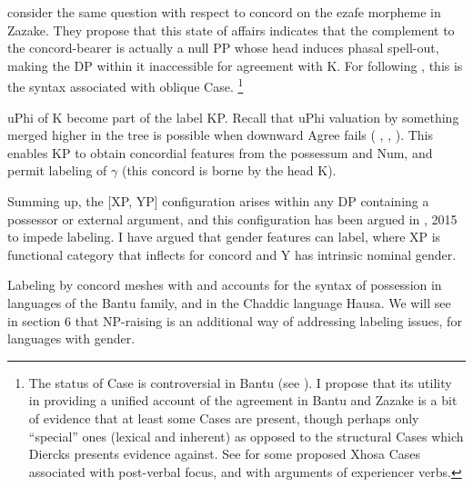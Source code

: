 \documentclass[output=paper
,modfonts
,nonflat]{langsci/langscibook}
\begin{document}
{\citet{Toosarvandani_Van_Urk2014} consider the same question with respect to concord on the ezafe morpheme in Zazake. They propose that this state of affairs indicates that the complement to the concord-bearer is actually a null PP whose head induces phasal spell-out, making the DP within it inaccessible for agreement with K. For \citet{Toosarvandani_Van_Urk2014} following \citet{Rezac2008}, this is the syntax associated with oblique Case. \footnote{The status of Case is controversial in Bantu (see \citealt{Diercks2012}). I propose that its utility in providing a unified account of the agreement in Bantu and Zazake is a bit of evidence that at least some Cases are present, though perhaps only “special” ones (lexical and inherent) as opposed to the structural Cases which Diercks presents evidence against. See \citet{Carstens_Mletshe2015} for some proposed Xhosa Cases associated with post-verbal focus, and with arguments of experiencer verbs.}
\begin{figure}[!h]
	\begin{exe}
		\ex 
	\end{exe}
\end{figure}
uPhi of K become part of the label KP. Recall that uPhi valuation by something merged higher in the tree is possible when downward Agree fails ( \citealt{Bejar_Rezac2009}, \citealt{Carstens2016},  \citealt{Toosarvandani_Van_Urk2014}). This enables KP to obtain concordial features from the possessum and Num, and permit labeling of $\gamma$ (this concord is borne by the head K).

Summing up, the [XP, YP] configuration arises within any DP containing a possessor or external argument, and this configuration has been argued in \citealt{Chomsky2013}, 2015 to impede labeling. I have argued that gender features can label, where XP is functional category that inflects for concord and Y has intrinsic nominal gender. 

Labeling by concord meshes with and accounts for the syntax of possession in languages of the Bantu family, and in the Chaddic language Hausa. We will see in section 6 that NP-raising is an additional way of addressing labeling issues, for languages with gender. 

}
\end{document}
